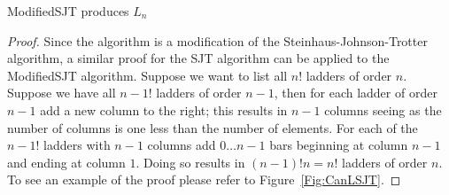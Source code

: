 \begin{lemma}
  {\sc ModifiedSJT} produces $L_{n}$
\end{lemma}
\begin{proof}
  Since the algorithm is a modification of the Steinhaus-Johnson-Trotter algorithm, a similar proof for the SJT algorithm 
can be applied to the {\sc ModifiedSJT} algorithm. Suppose we want to list all $n!$ ladders 
of order $n$. Suppose we have all $n-1!$ ladders of order $n-1$, then for 
each ladder of order $n-1$ add a new column to the right; this results in $n-1$ columns seeing as 
the number of columns is one less than the number of elements. For each of the $n-1!$ ladders with $n-1$ columns 
add $0 \dots n-1$ bars beginning at column $n-1$ and ending 
at column $1$. Doing so results in $(n-1)!n=n!$ ladders of order $n$. To see 
an example of the proof please refer to Figure~\ref{Fig:CanLSJT}.
\end{proof}
